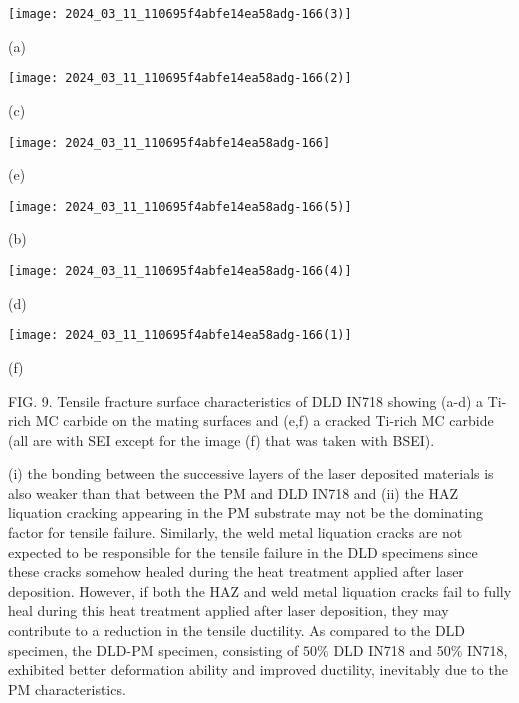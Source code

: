 \documentclass[10pt]{article}
\begin{document}
\begin{center}
\texttt{[image: 2024\_03\_11\_110695f4abfe14ea58adg-166(3)]}
\end{center}

(a)

\begin{center}
\texttt{[image: 2024\_03\_11\_110695f4abfe14ea58adg-166(2)]}
\end{center}

(c)

\begin{center}
\texttt{[image: 2024\_03\_11\_110695f4abfe14ea58adg-166]}
\end{center}

(e)

\begin{center}
\texttt{[image: 2024\_03\_11\_110695f4abfe14ea58adg-166(5)]}
\end{center}

(b)

\begin{center}
\texttt{[image: 2024\_03\_11\_110695f4abfe14ea58adg-166(4)]}
\end{center}

(d)

\begin{center}
\texttt{[image: 2024\_03\_11\_110695f4abfe14ea58adg-166(1)]}
\end{center}

(f)

FIG. 9. Tensile fracture surface characteristics of DLD IN718 showing (a-d) a Ti-rich MC carbide on the mating surfaces and (e,f) a cracked Ti-rich MC carbide (all are with SEI except for the image (f) that was taken with BSEI).

(i) the bonding between the successive layers of the laser deposited materials is also weaker than that between the PM and DLD IN718 and (ii) the HAZ liquation cracking appearing in the PM substrate may not be the dominating factor for tensile failure. Similarly, the weld metal liquation cracks are not expected to be responsible for the tensile failure in the DLD specimens since these cracks somehow healed during the heat treatment applied after laser deposition. However, if both the HAZ and weld metal liquation cracks fail to fully heal during this heat treatment applied after laser deposition, they may contribute to a reduction in the tensile ductility. As compared to the DLD specimen, the DLD-PM specimen, consisting of $50 \%$ DLD IN718 and 50\% IN718, exhibited better deformation ability and improved ductility, inevitably due to the PM characteristics.
\end{document}
